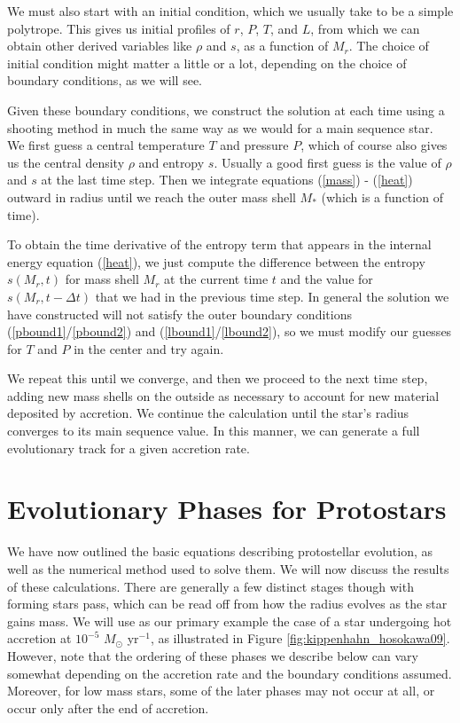 We must also start with an initial condition, which we usually take to be a simple polytrope. This gives us initial profiles of $r$, $P$, $T$, and $L$, from which we can obtain other derived variables like $\rho$ and $s$, as a function of $M_r$. The choice of initial condition might matter a little or a lot, depending on the choice of boundary conditions, as we will see.

Given these boundary conditions, we construct the solution at each time using a shooting method in much the same way as we would for a main sequence star. We first guess a central temperature $T$ and pressure $P$, which of course also gives us the central density $\rho$ and entropy $s$. Usually a good first guess is the value of $\rho$ and $s$ at the last time step.
Then we integrate equations (\ref{mass}) - (\ref{heat}) outward in radius until we reach the outer mass shell $M_*$ (which is a function of time).

To obtain the time derivative of the entropy term that appears in the internal energy equation (\ref{heat}), we just compute the difference between the entropy $s(M_r,t)$ for mass shell $M_r$ at the current time $t$ and the value for $s(M_r,t-\Delta t)$ that we had in the previous time step. In general the solution we have constructed will not satisfy the outer boundary conditions (\ref{pbound1}/\ref{pbound2}) and (\ref{lbound1}/\ref{lbound2}), so we must modify our guesses for $T$ and $P$ in the center and try again.

We repeat this until we converge, and then we proceed to the next time step, adding new mass shells on the outside as necessary to account for new material deposited by accretion. We continue the calculation until the star's radius converges to its main sequence value. In this manner, we can generate a full evolutionary track for a given accretion rate.

\section{Evolutionary Phases for Protostars}

We have now outlined the basic equations describing protostellar evolution, as well as the numerical method used to solve them. We will now discuss the results of these calculations. There are generally a few distinct stages though with forming stars pass, which can be read off from how the radius evolves as the star gains mass. We will use as our primary example the case of a star undergoing hot accretion at $10^{-5}$ $M_\odot$ yr$^{-1}$, as illustrated in Figure \ref{fig:kippenhahn_hosokawa09}. However, note that the ordering of these phases we describe below can vary somewhat depending on the accretion rate and the boundary conditions assumed. Moreover, for low mass stars, some of the later phases may not occur at all, or occur only after the end of accretion.

